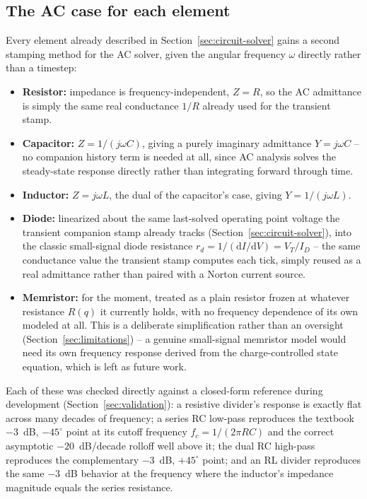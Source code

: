 \subsection{The AC case for each element}

Every element already described in Section~\ref{sec:circuit-solver} gains a second stamping
method for the AC solver, given the angular frequency $\omega$ directly rather than a timestep:
\begin{itemize}
\item \textbf{Resistor:} impedance is frequency-independent, $Z = R$, so the AC admittance is
simply the same real conductance $1/R$ already used for the transient stamp.
\item \textbf{Capacitor:} $Z = 1/(j\omega C)$, giving a purely imaginary admittance
$Y = j\omega C$ -- no companion history term is needed at all, since AC analysis solves the
steady-state response directly rather than integrating forward through time.
\item \textbf{Inductor:} $Z = j\omega L$, the dual of the capacitor's case, giving
$Y = 1/(j\omega L)$.
\item \textbf{Diode:} linearized about the same last-solved operating point voltage the
transient companion stamp already tracks (Section~\ref{sec:circuit-solver}), into the classic
small-signal diode resistance $r_d = 1/(\mathrm{d}I/\mathrm{d}V) = V_T/I_D$ -- the same
conductance value the transient stamp computes each tick, simply reused as a real admittance
rather than paired with a Norton current source.
\item \textbf{Memristor:} for the moment, treated as a plain resistor frozen at whatever
resistance $R(q)$ it currently holds, with no frequency dependence of its own modeled at all.
This is a deliberate simplification rather than an oversight (Section~\ref{sec:limitations}) --
a genuine small-signal memristor model would need its own frequency response derived from the
charge-controlled state equation, which is left as future work.
\end{itemize}
Each of these was checked directly against a closed-form reference during development
(Section~\ref{sec:validation}): a resistive divider's response is exactly flat across many
decades of frequency; a series RC low-pass reproduces the textbook $-3$~dB, $-45^\circ$ point at
its cutoff frequency $f_c = 1/(2\pi RC)$ and the correct asymptotic $-20$~dB/decade rolloff well
above it; the dual RC high-pass reproduces the complementary $-3$~dB, $+45^\circ$ point; and an
RL divider reproduces the same $-3$~dB behavior at the frequency where the inductor's impedance
magnitude equals the series resistance.

